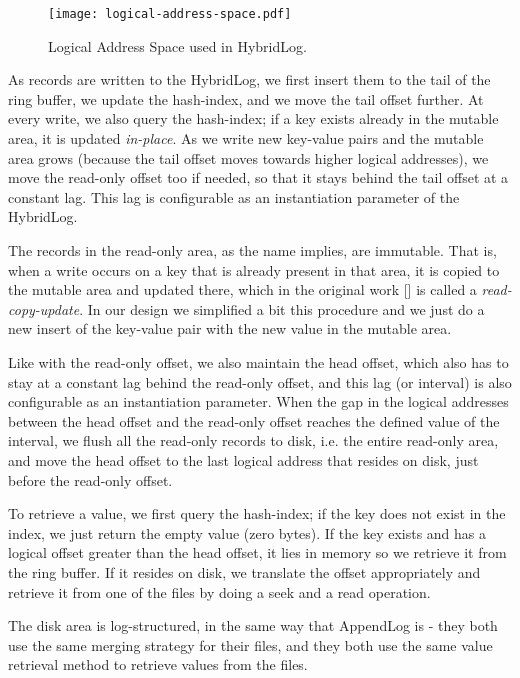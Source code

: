 \vspace{20px}
\begin{figure}[h]
    \centering
    \texttt{[image: logical-address-space.pdf]}
    \caption{Logical Address Space used in HybridLog.}
    \label{fig:logical-address-space}
\end{figure}
\vspace{20px}

As records are written to the HybridLog, we first insert them to the tail of the ring buffer, we update the hash-index, and we move the tail offset further.
At every write, we also query the hash-index; if a key exists already in the mutable area, it is updated \textit{in-place}.
As we write new key-value pairs and the mutable area grows (because the tail offset moves towards higher logical addresses), we move the read-only offset too if needed, so that it stays behind the tail offset at a constant lag. This lag is configurable as an instantiation parameter of the HybridLog.

The records in the read-only area, as the name implies, are immutable. That is, when a write occurs on a key that is already present in that area, it is copied to the mutable area and updated there, which in the original work [\cite{faster}] is called a \textit{read-copy-update}. In our design we simplified a bit this procedure and we just do a new insert of the key-value pair with the new value in the mutable area.

Like with the read-only offset, we also maintain the head offset, which also has to stay at a constant lag behind the read-only offset, and this lag (or interval) is also configurable as an instantiation parameter.
When the gap in the logical addresses between the head offset and the read-only offset reaches the defined value of the interval, we flush all the read-only records to disk, i.e. the entire read-only area, and move the head offset to the last logical address that resides on disk, just before the read-only offset.

To retrieve a value, we first query the hash-index; if the key does not exist in the index, we just return the empty value (zero bytes). If the key exists and has a logical offset greater than the head offset, it lies in memory so we retrieve it from the ring buffer. If it resides on disk, we translate the offset appropriately and retrieve it from one of the files by doing a seek and a read operation.

The disk area is log-structured, in the same way that AppendLog is - they both use the same merging strategy for their files, and they both use the same value retrieval method to retrieve values from the files.

